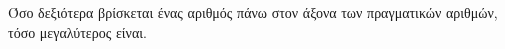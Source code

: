 \documentclass[11pt,a4paper]{article}
\newcommand{\kerkissans}[1]{{\fontfamily{maksf}\selectfont \textbf{#1}}}
\begin{document}
Όσο δεξιότερα βρίσκεται ένας αριθμός πάνω στον άξονα των πραγματικών αριθμών, τόσο μεγαλύτερος είναι.\\
\end{document}

